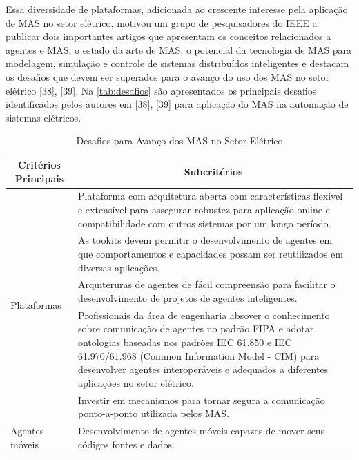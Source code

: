 \documentclass[journal]{IEEEtran}
\begin{document}
Essa diversidade de plataformas, adicionada ao crescente interesse pela aplicação de MAS no setor elétrico, motivou um grupo de pesquisadores do IEEE a publicar dois importantes artigos que apresentam os conceitos relacionados a agentes e MAS, o estado da arte de MAS, o potencial da tecnologia de MAS para modelagem, simulação e controle de sistemas distribuídos inteligentes e destacam os desafios que devem ser superados para o avanço do uso dos MAS no setor elétrico [38], [39]. Na \autoref{tab:desafios} são apresentados os principais desafios identificados pelos autores em [38], [39] para aplicação do MAS na automação de sistemas elétricos.

\begin{table}[!htb]
    \caption{Desafios para Avanço dos MAS no Setor Elétrico}
    \label{tab:desafios}
    \centering

    \begin{tabular}{p{0.9in} p{2.0in}}
    \toprule
    \multicolumn{1}{c}{\textbf{Critérios Principais}} & \multicolumn{1}{c}{\textbf{Subcritérios}} \\
    \midrule
    \midrule
         \multirow{5}{0.9in}{Plataformas} & Plataforma com arquitetura aberta com características flexível e extensível para assegurar robustez para aplicação online e compatibilidade com outros sistemas por um longo período. \\
    \midrule
        \multirow{4}{0.9in}{Toolkits} & As tookits devem permitir o desenvolvimento de agentes em que comportamentos e capacidades possam ser reutilizados em diversas aplicações. \\
    \midrule
        \multirow{3}{0.9in}{Arquiteturas de agentes} & Arquiteruras de agentes de fácil compreensão para facilitar o desenvolvimento de projetos de agentes inteligentes.\\
    \midrule
        \multirow{8}{0.9in}{Domínio dos padrões interoperáveis} & Profissionais da área de engenharia absover o conhecimento sobre comunicação de agentes no padrão FIPA e adotar ontologias baseadas nos padrões IEC 61.850 e IEC 61.970/61.968 (Common Information Model - CIM) para desenvolver agentes interoperáveis e adequados a diferentes aplicações no setor elétrico. \\
    \midrule
        \multirow{3}{0.9in}{Segurança} & Investir em mecanismos para tornar segura a comunicação ponto-a-ponto utilizada pelos MAS. \\
    \midrule
        \multirow{2}{0.9in}{Agentes móveis} & Desenvolvimento de agentes móveis capazes de mover seus códigos fontes e dados. \\
    \bottomrule
    \end{tabular}
\end{table}
\end{document}
